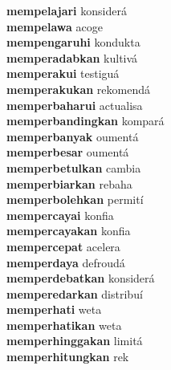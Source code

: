 \textbf{mempelajari } konsiderá \\
\textbf{mempelawa } acoge \\
\textbf{mempengaruhi } kondukta \\
\textbf{memperadabkan } kultivá \\
\textbf{memperakui } testiguá \\
\textbf{memperakukan } rekomendá \\
\textbf{memperbaharui } actualisa \\
\textbf{memperbandingkan } kompará \\
\textbf{memperbanyak } oumentá \\
\textbf{memperbesar } oumentá \\
\textbf{memperbetulkan } cambia \\
\textbf{memperbiarkan } rebaha \\
\textbf{memperbolehkan } permití \\
\textbf{mempercayai } konfia \\
\textbf{mempercayakan } konfia \\
\textbf{mempercepat } acelera \\
\textbf{memperdaya } defroudá \\
\textbf{memperdebatkan } konsiderá \\
\textbf{memperedarkan } distribuí \\
\textbf{memperhati } weta \\
\textbf{memperhatikan } weta \\
\textbf{memperhinggakan } limitá \\
\textbf{memperhitungkan } rek \\
